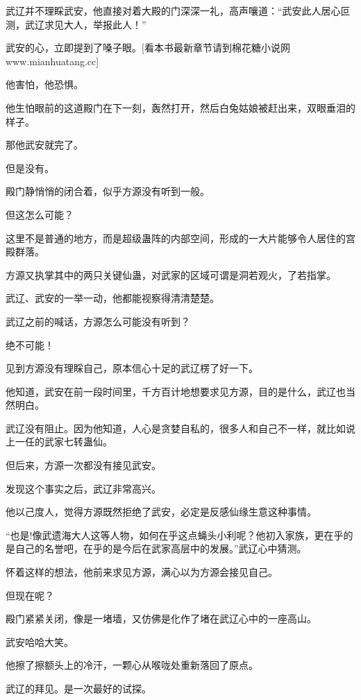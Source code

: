 
\begin{this_body}

武辽并不理睬武安，他直接对着大殿的门深深一礼，高声嚷道：“武安此人居心叵测，武辽求见大人，举报此人！”

武安的心，立即提到了嗓子眼。[看本书最新章节请到棉花糖小说网www.mianhuatang.cc]

他害怕，他恐惧。

他生怕眼前的这道殿门在下一刻，轰然打开，然后白兔姑娘被赶出来，双眼垂泪的样子。

那他武安就完了。

但是没有。

殿门静悄悄的闭合着，似乎方源没有听到一般。

但这怎么可能？

这里不是普通的地方，而是超级蛊阵的内部空间，形成的一大片能够令人居住的宫殿群落。

方源又执掌其中的两只关键仙蛊，对武家的区域可谓是洞若观火，了若指掌。

武辽、武安的一举一动，他都能视察得清清楚楚。

武辽之前的喊话，方源怎么可能没有听到？

绝不可能！

见到方源没有理睬自己，原本信心十足的武辽楞了好一下。

他知道，武安在前一段时间里，千方百计地想要求见方源，目的是什么，武辽也当然明白。

武辽没有阻止。因为他知道，人心是贪婪自私的，很多人和自己不一样，就比如说上一任的武家七转蛊仙。

但后来，方源一次都没有接见武安。

发现这个事实之后，武辽非常高兴。

他以己度人，觉得方源既然拒绝了武安，必定是反感仙缘生意这种事情。

“也是!像武遗海大人这等人物，如何在乎这点蝇头小利呢？他初入家族，更在乎的是自己的名誉吧，在乎的是今后在武家高层中的发展。”武辽心中猜测。

怀着这样的想法，他前来求见方源，满心以为方源会接见自己。

但现在呢？

殿门紧紧关闭，像是一堵墙，又仿佛是化作了堵在武辽心中的一座高山。

武安哈哈大笑。

他擦了擦额头上的冷汗，一颗心从喉咙处重新落回了原点。

武辽的拜见。是一次最好的试探。


\end{this_body}
